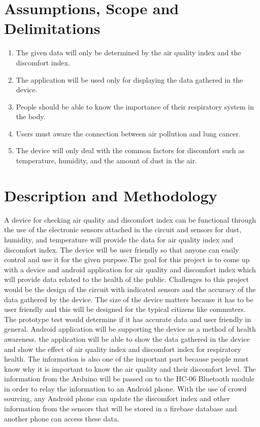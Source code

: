 \section{Assumptions, Scope and Delimitations}

\begin{enumerate}
\item The given data will only be determined by the air quality index and the discomfort index.

\item The application will be used only for displaying the data gathered in the device.

\item People should be able to know the importance of their respiratory system in the body.

\item Users must aware the connection between air pollution and lung cancer.

\item The device will only deal with the common factors for discomfort such as temperature, humidity, and the amount of dust in the air.

\end{enumerate}

\section{Description and Methodology}

A device for checking air quality and discomfort index can be functional through the use of the electronic sensors attached in the circuit and sensors for dust, humidity, and temperature will provide the data for air quality index and discomfort index. The device will be user friendly so that anyone can easily control and use it for the given purpose.The goal for this project is to come up with a device and android application for air quality and discomfort index which will provide data related to the health of the public.  Challenges to this project would be the design of the circuit with indicated sensors and the accuracy of the data gathered by the device. The size of the device matters because it has to be user friendly and this will be designed for the typical citizens like commuters. The prototype test  would determine if it has accurate data and user friendly in general. Android application will be supporting the device as a method of health awareness. the application will be able to show the data gathered in the device and show the effect of air quality index and discomfort index for respiratory health. The information is also one of the important part because people must know why it is important to know the air quality and their discomfort level. The information from the Arduino will be passed on to the HC-06 Bluetooth module in order to relay the information to an Android phone.  With the use of crowd sourcing, any Android phone can update the discomfort index and other information from the sensors that will be stored in a firebase database and another phone can access these data.  



